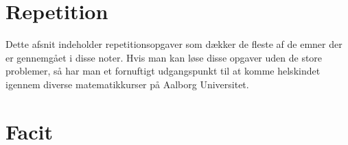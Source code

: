 




\chapter{Repetition}\label{ch:rep}
Dette afsnit indeholder repetitionsopgaver som dækker de fleste af de emner der er gennemgået i disse noter. Hvis man kan løse disse opgaver uden de store problemer, så har man et fornuftigt udgangspunkt til at komme helskindet igennem diverse matematikkurser på Aalborg Universitet. 


\chapter{Facit}
































